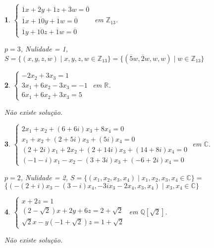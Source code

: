 \documentclass[12pt]{exam}
\newtheorem{exercicio}{}
\newcommand{\integer}{\mathbb{Z}}
\newcommand{\rac}{\mathbb{Q}}
\newcommand{\real}{\mathbb{R}}
\newcommand{\complex}{\mathbb{C}}
\begin{document}
\begin{exercicio}
$\begin{cases}
  \overline{1}x + \overline{2}y + \overline{1}z + \overline{3}w = \overline{0}\\
  \overline{1}x + \overline{10}y + \overline{1}w = \overline{0}\\
  \overline{1}y + \overline{10}z + \overline{1}w = \overline{0}
\end{cases}$ em $\integer_{13}$.
\begin{solucao}
  $p = 3$, Nulidade = 1, $S = \{(x, y, z, w) \mid x, y, z, w \in \integer_{13}\} = \{(\overline{5}w, \overline{2}w,w, w) \mid w \in \integer_{13}\}$
\end{solucao}
\end{exercicio}

\begin{exercicio}
  $\begin{cases}
    -2x_2 + 3x_3 = 1\\
    3x_1 + 6x_2 - 3x_3 = -1\\
    6x_1 + 6x_2 + 3x_3 = 5
  \end{cases}$ em $\real$.
  \begin{solucao}
    N\~ao existe solu\c{c}\~ao.
  \end{solucao}
\end{exercicio}

\begin{exercicio}
  $\begin{cases}
    2x_1 + x_2 + (6 + 6i)x_3 + 8x_4 = 0\\
    x_1 + x_2 + (2 + 5i)x_3 + (5  i)x_4 = 0\\
    (2 + 2i)x_1 + 2x_2 + (2 + 14i)x_3 + (14 + 8i)x_4 =0\\
    (-1 - i)x_1 - x_2 - (3 + 3i)x_3 + (-6 + 2i)x_4 = 0
  \end{cases}$ em $\complex$.
  \begin{solucao}
    $p = 2$, Nulidade = 2, $S = \{(x_1, x_2, x_3, x_4) \mid x_1, x_2, x_3, x_4 \in \complex\} = $\\ $\{(-(2 + i)x_3 - (3 - i)x_4,-3ix_3 - 2x_4, x_3, x_4) \mid x_3, x_4 \in \complex\}$
  \end{solucao}
\end{exercicio}

\begin{exercicio}
  $\begin{cases}
    x + 2z = 1\\
    (2 - \sqrt{2})x + 2y + 6z = 2 + \sqrt{2}\\
    \sqrt{2}x - y (-1 + \sqrt{2})z = 1 + \sqrt{2}
  \end{cases}$ em $\rac[\sqrt{2}]$.
  \begin{solucao}
    N\~ao existe solu\c{c}\~ao.
  \end{solucao}
\end{exercicio}
\end{document}
